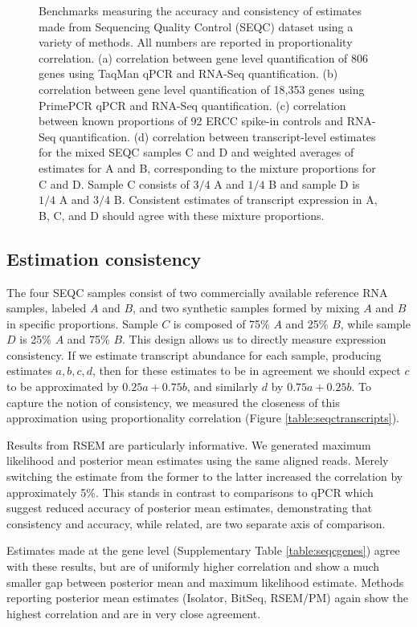 \documentclass[twocolumn]{article}
\begin{document}
\begin{figure*}
\caption{
Benchmarks measuring the accuracy and consistency of estimates made from 
Sequencing Quality Control (SEQC) dataset using a variety of methods.
All numbers are reported in proportionality correlation.
(a) correlation between gene level quantification
of 806 genes using TaqMan qPCR and RNA-Seq quantification.
(b) correlation between gene level quantification
of 18,353 genes using PrimePCR qPCR and RNA-Seq quantification.
(c) correlation between known proportions of 92
ERCC spike-in controls and RNA-Seq quantification.
(d) correlation between transcript-level estimates
for the mixed SEQC samples C and D and weighted averages of estimates for A
and B, corresponding to the mixture proportions for C and D. Sample C consists of
$3/4$ A and $1/4$ B and sample D is $1/4$ A and $3/4$ B. Consistent estimates of
transcript expression in A, B, C, and D should agree with these mixture
proportions.}
\end{figure*}

\subsection{Estimation consistency}\label{estimation-consistency}

The four SEQC samples consist of two commercially available reference RNA
samples, labeled $A$ and $B$, and two synthetic samples formed by mixing $A$ and
$B$ in specific proportions. Sample $C$ is composed of 75\% $A$ and 25\% $B$,
while sample $D$ is 25\% $A$ and 75\% $B$. This design allows us to directly
measure expression consistency. If we estimate transcript abundance for each
sample, producing estimates $a, b, c, d$, then for these estimates to be in
agreement we should expect $c$ to be approximated by $0.25a + 0.75b$, and
similarly $d$ by $0.75a + 0.25b$. To capture the notion of consistency, we
measured the closeness of this approximation using proportionality correlation
(Figure \ref{table:seqctranscripts}).

Results from RSEM are particularly informative. We generated maximum likelihood
and posterior mean estimates using the same aligned reads. Merely switching the
estimate from the former to the latter increased the correlation by
approximately 5\%. This stands in contrast to comparisons to qPCR which suggest
reduced accuracy of posterior mean estimates, demonstrating that consistency and
accuracy, while related, are two separate axis of comparison.

Estimates made at the gene level (Supplementary Table \ref{table:seqcgenes})
agree with these results, but are of uniformly higher correlation and show a
much smaller gap between posterior mean and maximum likelihood estimate.
Methods reporting posterior mean estimates (Isolator, BitSeq, RSEM/PM) again
show the highest correlation and are in very close agreement.
\end{document}
